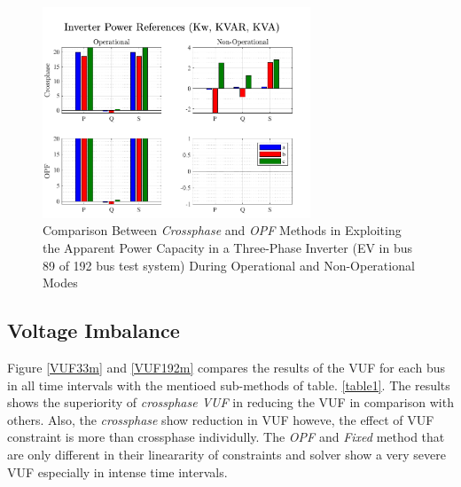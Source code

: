 \documentclass[journal]{IEEEtran}
\begin{document}

\begin{figure}
\centering
\includegraphics[width=8cm]{pdf/Cross.pdf}
\caption{Comparison Between \textit{Crossphase} and \textit{OPF} Methods in Exploiting the Apparent Power Capacity in a Three-Phase Inverter (EV in bus 89 of 192 bus test system) During Operational and Non-Operational Modes}
\label{Cross}
\end{figure}
\subsection{Voltage Imbalance}
Figure \ref{VUF33m} and \ref{VUF192m} compares the results of the VUF for each bus in all time intervals with the mentioed sub-methods of table. \ref{table1}. The results shows the superiority of \textit{crossphase VUF} in reducing the VUF in comparison with others.
Also, the  \textit{crossphase} show reduction in VUF howeve, the effect of VUF constraint is more than crossphase individully. The  \textit{OPF} and \textit{Fixed} method that are only different in their lineararity of constraints and solver show a very severe VUF especially in intense time intervals. 
\end{document}
